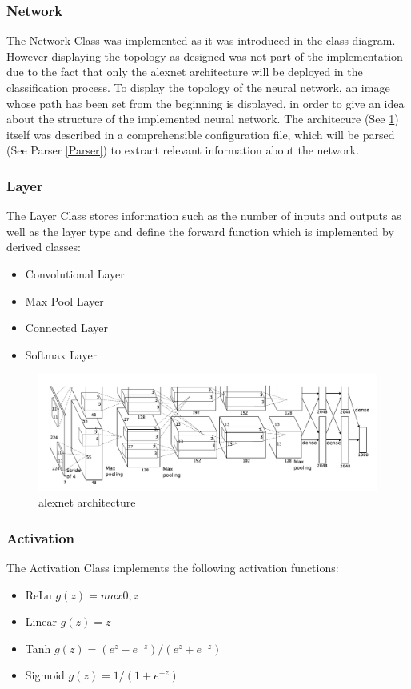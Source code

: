 \documentclass[parskip=full]{scrartcl}
\newcommand\tab[1][1cm]{\hspace*{#1}}
\begin{document}
		\subsubsection {Network}
		\tab The Network Class was implemented as it was introduced in the class diagram. However displaying the topology  as designed was not part of the implementation due to the fact that only the alexnet architecture will be deployed in the classification process. To display the topology of the neural network, an image whose path has been set from the beginning is displayed, in order to give an idea about the structure of the implemented neural network.
		The architecure (See \ref{fig:alexnet-architecture}) itself was described in a comprehensible configuration file, which will be parsed (See Parser \ref{Parser}) to extract relevant information about the network.
		
		\subsubsection {Layer}
		\tab The Layer Class stores information such as the number of inputs and outputs as well as the layer type and define the forward function which is implemented by derived classes:\\
		\begin{itemize}
			\item Convolutional Layer
			\item Max Pool Layer
			\item Connected Layer
			\item Softmax Layer
		\end{itemize}
		\begin{figure}
			\centering
			\includegraphics[width=1.0\textwidth]{alexnet-architecture}
			\caption{alexnet architecture}
			\label{fig:alexnet-architecture}
		\end{figure}
		
		\subsubsection {Activation}
		\tab The Activation Class implements the following activation functions:
		\begin{itemize}
			\item ReLu $g(z) = max{0, z}$
			\item Linear $g(z) =z$
			\item Tanh  $g(z) = (e^z -e^{-z}) / (e^z + e^{-z})$
			\item Sigmoid $g(z) = 1 / (1 + e^{-z})$
		\end{itemize}
		
\end{document}

